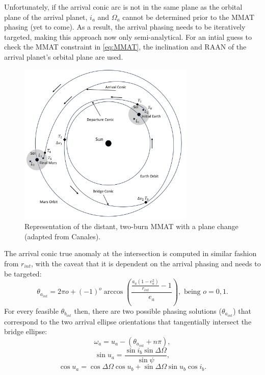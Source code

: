 Unfortunately, if the arrival conic arc is not in the same plane as the orbital plane of the
arrival planet, $i_{a}$ and $\Omega_{a}$ cannot be determined prior to the MMAT phasing (yet to
come). As a result, the arrival phasing needs to be iteratively targeted, making this approach now
only semi-analytical. For an intial guess to check the MMAT constraint in \cref{eq:MMAT}, the
inclination and RAAN of the arrival planet's orbital plane are used.

\begin{figure}[ht]
    \centering
    \includegraphics[width=0.75\textwidth]{figures/MMAT.jpg}
    \caption{Representation of the distant, two-burn MMAT with a plane change (adapted from Canales\cite{Canales:2021b}).}
    \label{fig:MMAT}
\end{figure}

The arrival conic true anomaly at the intersection is computed in similar fashion from $r_{int}$,
with the caveat that it is dependent on the arrival phasing and needs to be targeted:
\begin{equation}
    \theta_{a_{int}}=2\pi o+(-1)^{o}\arccos(\frac{\frac{a_{a}(1-e_{a}^{2})}{r_{int}}-1}{e_{a}}),\text{ being }o=0,1.
    \label{eq:arrivalintersect}
\end{equation}
For every feasible $\theta_{b_{int}}$ then, there are two possible phasing solutions
($\theta_{a_{int}}$) that correspond to the two arrival ellipse orientations that tangentially
intersect the bridge ellipse:
\begin{equation}
    \omega_{a}=u_{a}-(\theta_{a_{int}}+n\pi),
    \label{eq:arrivalperiapse}
\end{equation}
\begin{equation}
    \sin u_{a}=\frac{\sin i_{b}\sin\Delta\Omega}{\sin\psi},
    \label{eq:arrivalsinu}
\end{equation}
\begin{equation}
    \cos u_{a}=\cos\Delta\Omega\cos u_{b}+\sin\Delta\Omega\sin u_{b}\cos i_{b}.
    \label{eq:arrivalcosu}
\end{equation}

